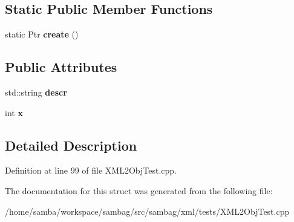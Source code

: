\subsection*{Static Public Member Functions}
\begin{DoxyCompactItemize}
\item 
\hypertarget{struct_object_b_a3f9d1754512a4336dcb6b12eb92c646a}{
static Ptr {\bfseries create} ()}
\label{struct_object_b_a3f9d1754512a4336dcb6b12eb92c646a}

\end{DoxyCompactItemize}
\subsection*{Public Attributes}
\begin{DoxyCompactItemize}
\item 
\hypertarget{struct_object_b_a1e6125e5a6a68ece3bb3892b4112f8bc}{
std::string {\bfseries descr}}
\label{struct_object_b_a1e6125e5a6a68ece3bb3892b4112f8bc}

\item 
\hypertarget{struct_object_b_a87defdb7fc7f6a61a02a5ba0cae1fe21}{
int {\bfseries x}}
\label{struct_object_b_a87defdb7fc7f6a61a02a5ba0cae1fe21}

\end{DoxyCompactItemize}


\subsection{Detailed Description}


Definition at line 99 of file XML2ObjTest.cpp.



The documentation for this struct was generated from the following file:\begin{DoxyCompactItemize}
\item 
/home/samba/workspace/sambag/src/sambag/xml/tests/XML2ObjTest.cpp\end{DoxyCompactItemize}

